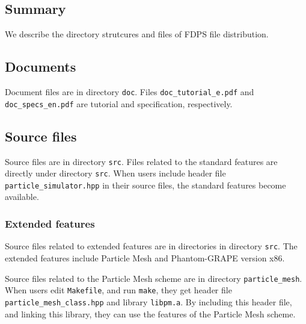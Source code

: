 \subsection{Summary}

We describe the directory strutcures and files of FDPS file
distribution.

\subsection{Documents}

Document files are in directory \texttt{doc}. Files
\texttt{doc\_tutorial\_e.pdf} and \texttt{doc\_specs\_en.pdf} are
tutorial and specification, respectively.

\subsection{Source files}

Source files are in directory \texttt{src}. Files related to the
standard features are directly under directory \texttt{src}. When
users include header file \texttt{particle\_simulator.hpp} in their
source files, the standard features become available.

\subsubsection{Extended features}

Source files related to extended features are in directories in
directory \texttt{src}. The extended features include Particle Mesh
and Phantom-GRAPE version x86.


Source files related to the Particle Mesh scheme are in directory
\texttt{particle\_mesh}.  When users edit \texttt{Makefile}, and
run \texttt{make}, they get header file
\texttt{particle\_mesh\_class.hpp} and library \texttt{libpm.a}. By
including this header file, and linking this library, they can use the
features of the Particle Mesh scheme.

